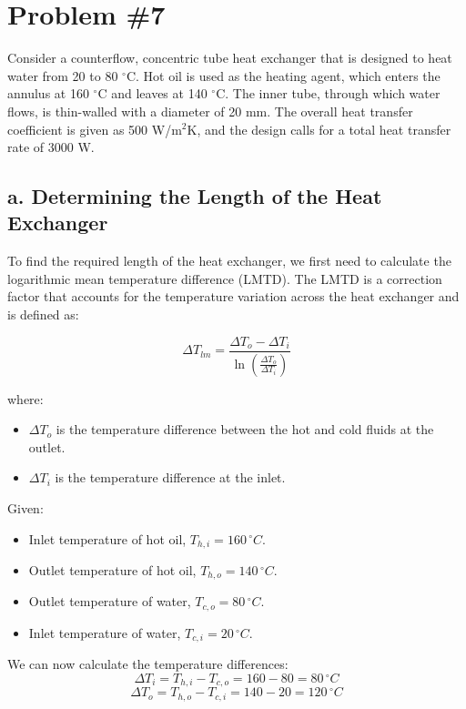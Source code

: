 \documentclass{article}
\begin{document}
\newpage
\section{Problem \#7}

Consider a counterflow, concentric tube heat exchanger that is designed to heat water from 20 to 80 \( ^{\circ}\)C. Hot oil is used as the heating agent, which enters the annulus at 160 \( ^{\circ}\)C and leaves at 140 \( ^{\circ}\)C. The inner tube, through which water flows, is thin-walled with a diameter of 20 mm. The overall heat transfer coefficient is given as 500 W/m\(^2\)K, and the design calls for a total heat transfer rate of 3000 W.

\subsection*{a. Determining the Length of the Heat Exchanger}

To find the required length of the heat exchanger, we first need to calculate the logarithmic mean temperature difference (LMTD). The LMTD is a correction factor that accounts for the temperature variation across the heat exchanger and is defined as:

\begin{equation}
\Delta T_{lm} = \frac{\Delta T_{o} - \Delta T_{i}}{\ln\left(\frac{\Delta T_{o}}{\Delta T_{i}}\right)}
\end{equation}

where:
\begin{itemize}
    \item \( \Delta T_{o} \) is the temperature difference between the hot and cold fluids at the outlet.
    \item \( \Delta T_{i} \) is the temperature difference at the inlet.
\end{itemize}

Given:
\begin{itemize}
    \item Inlet temperature of hot oil, \( T_{h,i} = 160 \, ^{\circ}C \).
    \item Outlet temperature of hot oil, \( T_{h,o} = 140 \, ^{\circ}C \).
    \item Outlet temperature of water, \( T_{c,o} = 80 \, ^{\circ}C \).
    \item Inlet temperature of water, \( T_{c,i} = 20 \, ^{\circ}C \).
\end{itemize}

We can now calculate the temperature differences:
\begin{equation}
\Delta T_{i} = T_{h,i} - T_{c,o} = 160 - 80 = 80 \, ^{\circ}C
\end{equation}
\begin{equation}
\Delta T_{o} = T_{h,o} - T_{c,i} = 140 - 20 = 120 \, ^{\circ}C
\end{equation}
\end{document}
